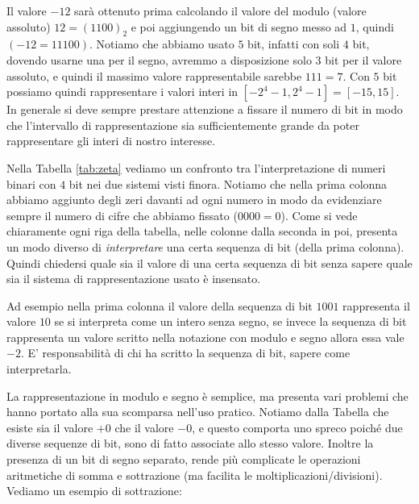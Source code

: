 \begin{ex} Il valore $-12$ sarà ottenuto prima calcolando il valore del modulo
(valore assoluto) $12 = (1100)_2$ e poi aggiungendo un bit di segno messo ad
$1$, quindi $(-12 = 11100)$. Notiamo che abbiamo usato $5$ bit, infatti con
soli $4$ bit, dovendo usarne una per il segno, avremmo a disposizione solo $3$
bit per il valore assoluto, e quindi il massimo valore rappresentabile sarebbe
$111 = 7$. Con $5$ bit possiamo quindi rappresentare i valori interi in
$[-2^4-1,2^4-1] = [-15,15]$. In generale si deve sempre prestare attenzione a
fissare il numero di bit in modo che l'intervallo di rappresentazione sia
sufficientemente grande da poter rappresentare gli interi di nostro interesse.
\end{ex}




Nella Tabella \ref{tab:zeta} vediamo un confronto tra l'interpretazione di numeri binari con $4$ bit nei due sistemi visti finora. Notiamo che nella prima
colonna abbiamo aggiunto degli zeri davanti ad ogni numero in modo da
evidenziare sempre il numero di cifre che abbiamo fissato ($0000 = 0$). Come si
vede chiaramente ogni riga della tabella, nelle colonne dalla seconda in poi, presenta un modo diverso di \emph{interpretare} una certa sequenza di bit (della prima colonna). Quindi chiedersi quale sia il valore di una
certa sequenza di bit senza sapere quale sia il sistema di rappresentazione
usato è insensato.

Ad esempio nella prima colonna il valore della sequenza di bit $1001$
rappresenta il valore $10$ se si interpreta come un intero senza segno, se
invece la sequenza di bit rappresenta un valore scritto nella notazione con
modulo e segno allora essa vale $-2$. E' responsabilità di chi ha scritto la
sequenza di bit, sapere come interpretarla.

La rappresentazione in modulo e segno è semplice, ma presenta vari problemi che
hanno portato alla sua scomparsa nell'uso pratico. Notiamo dalla Tabella che
esiste sia il valore $+0$ che il valore $-0$, e questo comporta uno spreco
poiché due diverse sequenze di bit, sono di fatto associate allo stesso valore.
Inoltre la presenza di un bit di segno separato, rende più complicate le
operazioni aritmetiche di somma e sottrazione (ma facilita le
moltiplicazioni/divisioni). Vediamo un esempio di sottrazione:

